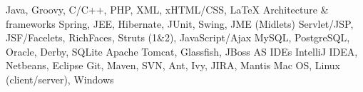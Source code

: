 
\cvcomputer
	{} {Java, Groovy, C/C++, PHP, XML, xHTML/CSS, \LaTeX}
	{Architecture \& frameworks} {Spring, JEE, Hibernate, JUnit, Swing, JME (Midlets)}
\cvcomputer
	{} {Servlet/JSP, JSF/Facelets, RichFaces, Struts (1\&2), JavaScript/Ajax}
	{} {MySQL, PostgreSQL, Oracle, Derby, SQLite}
\cvcomputer
	{} {Apache Tomcat, Glassfish, JBoss AS}
	{IDEs} {IntelliJ IDEA, Netbeans, Eclipse}
\cvcomputer
	{} {Git, Maven, SVN, Ant, Ivy, JIRA, Mantis}
	{} {Mac OS, Linux (client/server), Windows}
